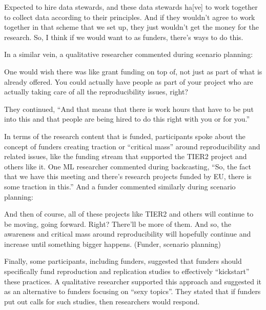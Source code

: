\documentclass[authordate, meta]{jote-new-article}
\begin{document}
	Expected to hire data stewards, and these data stewards ha[ve] to work together to collect data according to their principles. And if they wouldn't agree to work together in that scheme that we set up, they just wouldn't get the money for the research. So, I think if we would want to as funders, there's ways to do this.







	In a similar vein, a qualitative researcher commented during scenario planning:







	One would wish there was like grant funding on top of, not just as part of what is already offered. You could actually have people as part of your project who are actually taking care of all the reproducibility issues, right?







	They continued, “And that means that there is work hours that have to be put into this and that people are being hired to do this right with you or for you.”







	In terms of the research content that is funded, participants spoke about the concept of funders creating traction or “critical mass” around reproducibility and related issues, like the funding stream that supported the TIER2 project and others like it. One ML researcher commented during backcasting, “So, the fact that we have this meeting and there's research projects funded by EU, there is some traction in this.” And a funder commented similarly during scenario planning:







	And then of course, all of these projects like TIER2 and others will continue to be moving, going forward. Right? There'll be more of them. And so, the awareness and critical mass around reproducibility will hopefully continue and increase until something bigger happens. (Funder, scenario planning)







	Finally, some participants, including funders, suggested that funders should specifically fund reproduction and replication studies to effectively “kickstart” these practices. A qualitative researcher supported this approach and suggested it as an alternative to funders focusing on “sexy topics”. They stated that if funders put out calls for such studies, then researchers would respond.
\end{document}
